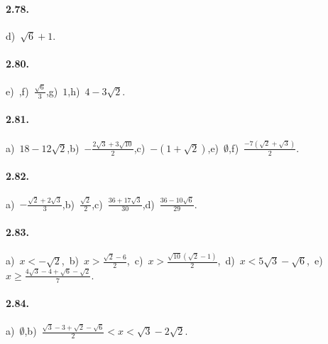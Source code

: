 \paragraph{2.78.}
d)~$\sqrt 6+1$.

\paragraph{2.80.}
e)~,\quad f)~$\frac{\sqrt 6} 3$,\quad g)~$1$,\quad h)~$4-3\sqrt 2$.

\paragraph{2.81.}
a)~$18-12\sqrt 2$,\quad b)~$-\frac{2\sqrt 3+3\sqrt{10}} 2$,\quad c)~$-(1+\sqrt 2)$,\quad e)~$\emptyset$,\quad f)~$\frac{-7(\sqrt 2+\sqrt 3)} 2$.

\paragraph{2.82.}
a)~$-\frac{\sqrt 2+2\sqrt 3} 3$,\quad b)~$\frac{\sqrt 2} 2$,\quad c)~$\frac{36+17\sqrt 3}{30}$,\quad d)~$\frac{36-10\sqrt 6}{29}$.

\paragraph{2.83.}
a)~$x<-\sqrt 2$,\, b)~$x>\frac{\sqrt 2-6} 2$,\, c)~$x>\frac{\sqrt{10}(\sqrt 2-1)} 2$,\, d)~$x<5\sqrt 3-\sqrt 6$,\, e)~$x\ge \frac{4\sqrt 3-4+\sqrt 6-\sqrt 2} 7$.

\paragraph{2.84.}
a)~$\emptyset$,\quad b)~$\frac{\sqrt 3-3+\sqrt 2-\sqrt 6} 2<x<\sqrt 3-2\sqrt 2$.

